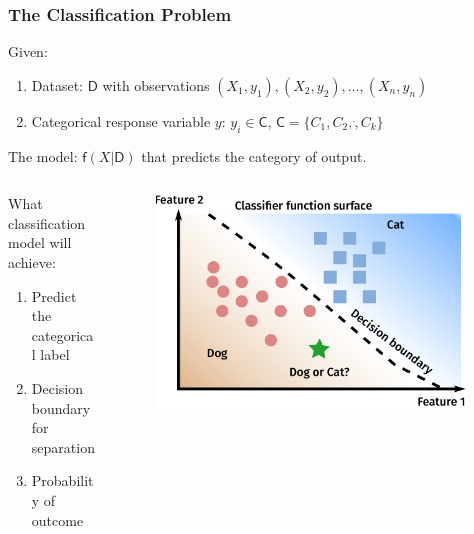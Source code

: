 \documentclass[10pt,aspectratio=169]{beamer}
\begin{document}
\begin{frame}
  \frametitle{The Classification Problem}

  Given:
  \begin{enumerate}
  \item Dataset: $\mathsf{D}$ with observations
    ${(X_{1}, y_{1}), (X_{2},y_{2}), \dots , (X_{n}, y_{n})}$
    
  \item Categorical response variable $y$: $y_{i} \in \mathsf{C}$, $\mathsf{C} = \{C_{1}, C_{2}, \dot, C_{k}\}$
  \end{enumerate}

  The model: $\mathsf{f}(X | \mathsf{D})$ that predicts the category of output.

  \vspace{2em}

  \begin{columns}[T]
    \begin{column}{0.5\textwidth}
    What classification model will achieve:
    \begin{enumerate}
    \item Predict the categorical label
    \item Decision boundary for separation
    \item Probability of outcome
    \end{enumerate}
  \end{column}
  
\begin{column}{0.5\textwidth}
  \begin{figure}[t]
    \vspace{-2em}
     \includegraphics[width=0.98\textwidth]{images/classification_dog_cat.pdf}
    \end{figure}
\end{column}
  \end{columns}
  
\end{frame}
\end{document}
